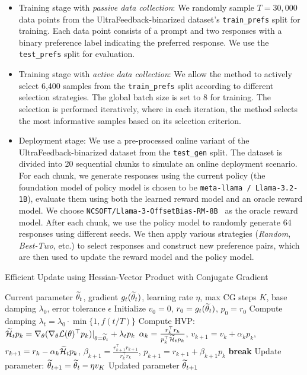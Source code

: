 \begin{itemize}
    \item Training stage with \emph{passive data collection}: We randomly sample $T=30, 000$ data points from the UltraFeedback-binarized dataset's \texttt{train\_prefs} split for training. Each data point consists of a prompt and two responses with a binary preference label indicating the preferred response. We use the \texttt{test\_prefs} split for evaluation.
    \item Training stage with \emph{active data collection}: We allow the method to actively select 6,400 samples from the \texttt{train\_prefs} split according to different selection strategies. The global batch size is set to 8 for training. The selection is performed iteratively, where in each iteration, the method selects the most informative samples based on its selection criterion.
    \item Deployment stage: We use a pre-processed online variant of the UltraFeedback-binarized dataset from the \texttt{test\_gen} split. The dataset is divided into 20 sequential chunks to simulate an online deployment scenario. For each chunk, we generate responses using the current policy (the foundation model of policy model is chosen to be \texttt{meta-llama / Llama-3.2-1B}), evaluate them using both the learned reward model and an oracle reward model. We choose \texttt{NCSOFT/Llama-3-OffsetBias-RM-8B}~\citep{arXiv'24:Park-OffsetBias} as the oracle reward model. After each chunk, we use the policy model to randomly generate 64 responses using different seeds. We then apply various strategies (\emph{Random}, \emph{Best-Two}, etc.) to select responses and construct new preference pairs, which are then used to update the reward model and the policy model.
\end{itemize}

\begin{algorithm}[!t]
    \caption{Efficient Update using Hessian-Vector Product with Conjugate Gradient}
    \label{alg:hvp-cg}
    \begin{algorithmic}[1]
        \REQUIRE Current parameter $\widetilde{\theta}_t$, gradient $g_t(\widetilde{\theta}_t)$, learning rate $\eta$, max CG steps $K$, base damping $\lambda_0$, error tolerance $\epsilon$
        \STATE Initialize $v_0 = 0$, $r_0 = g_t(\widetilde{\theta}_t)$, $p_0 = r_0$
        \STATE Compute damping $\lambda_t = \lambda_0 \cdot \min\{1, f(t/T)\}$
        \STATE Compute HVP: $\widetilde{\mathcal{H}}_t p_k = \nabla_\theta(\nabla_\theta \mathcal{L}(\theta)^\top p_k)|_{\theta=\widetilde{\theta}_t} + \lambda_t p_k$
        \STATE $\alpha_k = \frac{r_k^\top r_k}{p_k^\top \widetilde{\mathcal{H}}_t p_k}$, $v_{k+1} = v_k + \alpha_k p_k$, $r_{k+1} = r_k - \alpha_k \widetilde{\mathcal{H}}_t p_k$,
        \STATE  $\beta_{k+1} = \frac{r_{k+1}^\top r_{k+1}}{r_k^\top r_k}$, $p_{k+1} = r_{k+1} + \beta_{k+1} p_k$
        \STATE \textbf{break}
        \ENDIF
        \ENDFOR
        \STATE Update parameter: $\widetilde{\theta}_{t+1} = \widetilde{\theta}_t - \eta v_{K}$
        \ENSURE Updated parameter $\widetilde{\theta}_{t+1}$
    \end{algorithmic}
\end{algorithm}

